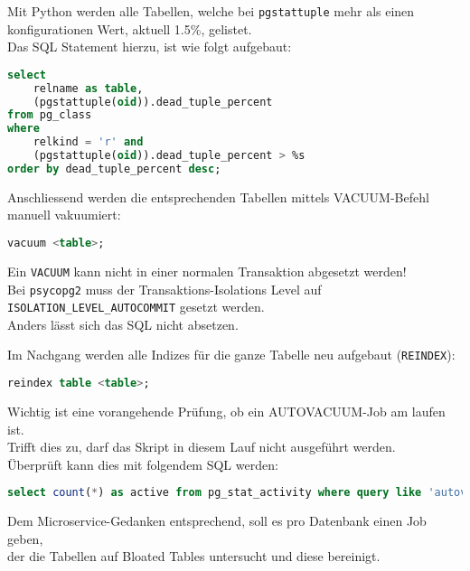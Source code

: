 \begin{flushleft}
    Mit Python werden alle Tabellen, welche bei \texttt{pgstattuple} mehr als einen konfigurationen Wert, aktuell 1.5\%, gelistet.\\
    Das SQL Statement hierzu, ist wie folgt aufgebaut:
    \lstset{style=gra_codestyle}
    \begin{lstlisting}[language=sql, caption=Maintenance-Tool - List - Maintenance-Tool - Bloated Tables / Indices,captionpos=b,label={lst:maintenannce-tool-list-bloated-tables},breaklines=true]
select
    relname as table,
    (pgstattuple(oid)).dead_tuple_percent
from pg_class
where
    relkind = 'r' and
    (pgstattuple(oid)).dead_tuple_percent > %s
order by dead_tuple_percent desc;
    \end{lstlisting}
    Anschliessend werden die entsprechenden Tabellen mittels VACUUM-Befehl manuell vakuumiert:
    \lstset{style=gra_codestyle}
    \begin{lstlisting}[language=sql, caption=Maintenance-Tool - VACUUM - Maintenance-Tool - Bloated Tables / Indices,captionpos=b,label={lst:maintenannce-tool-vacuum-bloated-tables},breaklines=true]
vacuum <table>;
    \end{lstlisting}
    \begin{warning}
        Ein \texttt{VACUUM} kann nicht in einer normalen Transaktion abgesetzt werden!\\
        Bei \texttt{psycopg2} muss der Transaktions-Isolations Level auf \texttt{ISOLATION\_LEVEL\_AUTOCOMMIT} gesetzt werden.\\
        Anders lässt sich das SQL nicht absetzen.
    \end{warning}
    Im Nachgang werden alle Indizes für die ganze Tabelle neu aufgebaut (\texttt{REINDEX}):
    \lstset{style=gra_codestyle}
    \begin{lstlisting}[language=sql, caption=Maintenance-Tool - REINDEX - Maintenance-Tool - Bloated Tables / Indices,captionpos=b,label={lst:maintenannce-tool-reindex-bloated-tables},breaklines=true]
reindex table <table>;
    \end{lstlisting}
\end{flushleft}
\begin{flushleft}
    Wichtig ist eine vorangehende Prüfung, ob ein \Gls{AUTOVACUUM}-Job am laufen ist.\\
    Trifft dies zu, darf das Skript in diesem Lauf nicht ausgeführt werden.\\
    Überprüft kann dies mit folgendem SQL werden:
    \lstset{style=gra_codestyle}
    \begin{lstlisting}[language=sql, caption=Maintenance-Tool - Check AUTOVACUUM - Maintenance-Tool - Bloated Tables / Indices,captionpos=b,label={lst:maintenannce-tool-check-autovacuum-bloated-tables},breaklines=true]
select count(*) as active from pg_stat_activity where query like 'autovacuum:%';
    \end{lstlisting}
\end{flushleft}
\begin{flushleft}
    Dem Microservice-Gedanken entsprechend, soll es pro Datenbank einen Job geben,\\
    der die Tabellen auf Bloated Tables untersucht und diese bereinigt.
\end{flushleft}